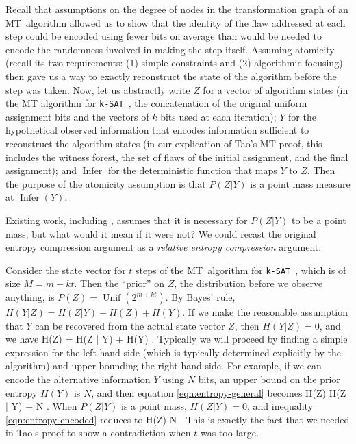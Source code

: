 \documentclass[twocolumn]{article}
\newcommand{\ksat}{\texttt{k-SAT}~}
\newcommand{\mt}{MT~}
\def\seqn#1\eeqn{\begin{align}#1\end{align}}
\begin{document}
Recall that assumptions on the degree of nodes in the transformation graph of an \mt algorithm allowed us to show that the identity of the flaw addressed at each step could be encoded using fewer bits on average than would be needed to encode the randomness involved in making the step itself.  Assuming atomicity (recall its two requirements: (1) simple constraints and (2) algorithmic focusing) then gave us a way to exactly reconstruct the state of the algorithm before the step was taken.  Now, let us abstractly write $Z$ for a vector of algorithm states (in the MT algorithm for \ksat, the concatenation of the original uniform assignment bits and the vectors of $k$ bits used at each iteration); $Y$ for the hypothetical observed information that encodes information sufficient to reconstruct the algorithm states (in our explication of Tao's MT proof, this includes the witness forest, the set of flaws of the initial assignment, and the final assignment); and $\operatorname{Infer}$ for the deterministic function that maps $Y$ to $Z$.  Then the purpose of the atomicity assumption is that $P(Z | Y)$ is a point mass measure at $\operatorname{Infer}(Y)$.

Existing work, including \cite{achlioptas2014random}, assumes that it is necessary for $P(Z | Y)$ to be a point mass, but what would it mean if it were not?  We could recast the original entropy compression argument as a \emph{relative entropy compression} argument.

Consider the state vector for $t$ steps of the \mt algorithm for \ksat, which is of size $M = m + kt$.  Then the ``prior'' on $Z$, the distribution before we observe anything, is $P(Z) = \operatorname{Unif}(2^{m+kt})$.  By Bayes' rule, $H(Y | Z) = H(Z | Y) - H(Z) + H(Y)$.  If we make the reasonable assumption that $Y$ can be recovered from the actual state vector $Z$, then $H(Y | Z) = 0$, and we have
\seqn
  \label{eqn:entropy-general}
  H(Z) = H(Z | Y) + H(Y) .
\eeqn
Typically we will proceed by finding a simple expression for the left hand side (which is typically determined explicitly by the algorithm) and upper-bounding the right hand side.  For example, if we can encode the alternative information $Y$ using $N$ bits, an upper bound on the prior entropy $H(Y)$ is $N$, and then equation \ref{eqn:entropy-general} becomes
\seqn
  \label{eqn:entropy-encoded}
  H(Z) \leq H(Z | Y) + N .
\eeqn
When $P(Z | Y)$ is a point mass, $H(Z | Y) = 0$, and inequality \ref{eqn:entropy-encoded} reduces to
\seqn
  \label{eqn:entropy-tao}
  H(Z) \leq N .
\eeqn
This is exactly the fact that we needed in Tao's proof to show a contradiction when $t$ was too large.
\end{document}
